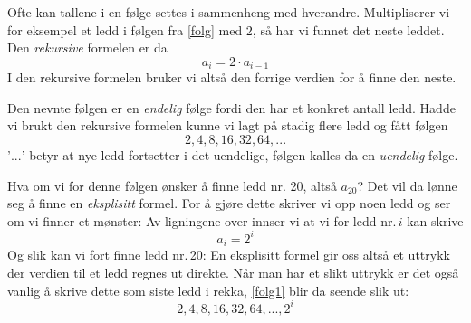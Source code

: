 Ofte kan tallene i en følge settes i sammenheng med hverandre. Multipliserer vi for eksempel et ledd i følgen fra \eqref{folg} med $ 2 $, så har vi funnet det neste leddet. Den \textit{rekursive} formelen er da
\[ a_i = 2\cdot a_{i-1} \]
I den rekursive formelen bruker vi altså den forrige verdien for å finne den neste. \vsk

Den nevnte følgen er en \textit{endelig} følge fordi den har et konkret antall ledd. Hadde vi brukt den rekursive formelen kunne vi lagt på stadig flere ledd og fått følgen
\begin{equation}
 2, 4, 8, 16, 32, 64, ...  \label{folg1}
\end{equation}
'$ ... $' betyr at nye ledd fortsetter i det uendelige, følgen kalles da en \textit{uendelig} følge. \vsk

Hva om vi for denne følgen ønsker å finne ledd nr. 20, altså $ a_{20} $? Det vil da lønne seg å finne en \textit{eksplisitt} formel. For å gjøre dette skriver vi opp noen ledd og ser om vi finner et mønster: 
Av ligningene over innser vi at vi for ledd nr.\,$ i $ kan skrive
\[ a_i=2^i \] 
Og slik kan vi fort finne ledd nr.\,20:
En eksplisitt formel gir oss altså et uttrykk der verdien til et ledd regnes ut direkte. Når man har et slikt uttrykk er det også vanlig å skrive dette som siste ledd i rekka, \eqref{folg1} blir da seende slik ut:
\[  2, 4, 8, 16, 32, 64, ..., 2^i \]
 

